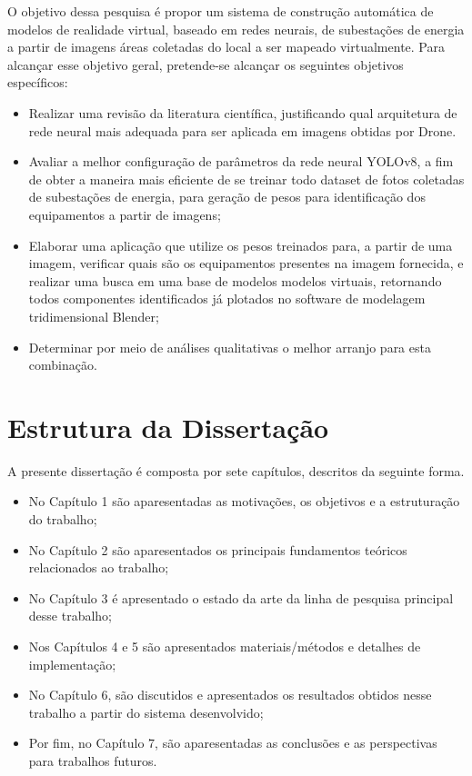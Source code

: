 O objetivo dessa pesquisa é propor um sistema de construção automática de modelos de realidade virtual, baseado em redes neurais, de subestações de energia a partir  de imagens áreas coletadas do local a ser mapeado virtualmente. Para alcançar esse objetivo geral, pretende-se alcançar os seguintes objetivos específicos:
\begin{itemize}
\item Realizar uma revisão da literatura científica, justificando qual arquitetura de rede neural mais adequada para ser aplicada em imagens obtidas por Drone.
\item Avaliar a melhor configuração de parâmetros da rede neural YOLOv8, a fim de obter a maneira mais eficiente de se treinar todo dataset de fotos coletadas de subestações de energia, para geração de pesos para identificação dos equipamentos a partir de imagens;
\item Elaborar uma aplicação que utilize os pesos treinados para, a partir de uma imagem, verificar quais são os equipamentos presentes na imagem fornecida, e realizar uma busca em uma base de modelos modelos virtuais, retornando todos componentes identificados já plotados no software de modelagem tridimensional Blender;
\item Determinar por meio de análises qualitativas o melhor arranjo para esta combinação.
\end{itemize}

\section{Estrutura da Dissertação}

A presente dissertação é composta por sete capítulos, descritos da seguinte forma.
\begin{itemize}
\item No Capítulo 1 são aparesentadas as motivações, os objetivos e a estruturação do trabalho;
\item No Capítulo 2 são aparesentados os principais fundamentos teóricos relacionados ao trabalho;
\item No Capítulo 3 é apresentado o estado da arte da linha de pesquisa principal desse trabalho;
\item Nos Capítulos 4 e 5 são apresentados materiais/métodos e detalhes de implementação;
\item No Capítulo 6, são discutidos e apresentados os resultados obtidos nesse trabalho a partir do sistema desenvolvido;
\item Por fim, no Capítulo 7, são aparesentadas as conclusões e as perspectivas para trabalhos futuros.
\end{itemize}